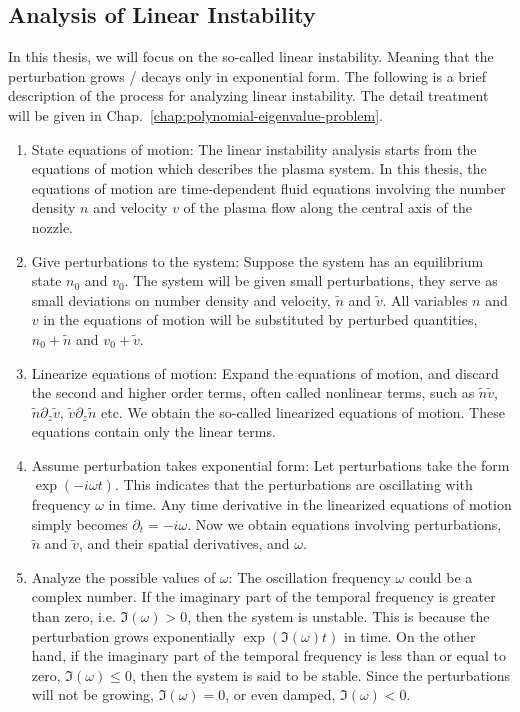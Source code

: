 \subsection{Analysis of Linear Instability}
In this thesis, we will focus on the so-called linear instability. Meaning that the perturbation grows / decays only in exponential form. The following is a brief description of the process for analyzing linear instability. The detail treatment will be given in Chap.~\ref{chap:polynomial-eigenvalue-problem}.

\begin{enumerate}
	\item State equations of motion: The linear instability analysis starts from the equations of motion which describes the plasma system. In this thesis, the equations of motion are time-dependent fluid equations involving the number density $n$ and velocity $v$ of the plasma flow along the central axis of the nozzle.
	\item Give perturbations to the system: Suppose the system has an equilibrium state $n_0$ and $v_0$. The system will be given small perturbations, they serve as small deviations on number density and velocity, $\tilde{n}$ and $\tilde{v}$. All variables $n$ and $v$ in the equations of motion will be substituted by perturbed quantities, $n_0+\tilde{n}$ and $v_0+\tilde{v}$.
	\item Linearize equations of motion: Expand the equations of motion, and discard the second and higher order terms, often called nonlinear terms, such as $\tilde{n}\tilde{v}$, $\tilde{n}\partial_z\tilde{v}$, $\tilde{v}\partial_z\tilde{n}$ etc. We obtain the so-called linearized equations of motion. These equations contain only the linear terms.
	\item Assume perturbation takes exponential form: Let perturbations take the form $\exp(-i\omega t)$. This indicates that the perturbations are oscillating with frequency $\omega$ in time. Any time derivative in the linearized equations of motion simply becomes $\partial_t = -i\omega$. Now we obtain equations involving perturbations, $\tilde{n}$ and $\tilde{v}$, and their spatial derivatives, and $\omega$.
	\item Analyze the possible values of $\omega$: The oscillation frequency $\omega$ could be a complex number. If the imaginary part of the temporal frequency is greater than zero, i.e. $\Im(\omega) > 0$, then the system is unstable. This is because the perturbation grows exponentially $\exp(\Im(\omega)t)$ in time. On the other hand, if the imaginary part of the temporal frequency is less than or equal to zero, $\Im(\omega) \leq 0$, then the system is said to be stable. Since the perturbations will not be growing, $\Im(\omega)=0$, or even damped, $\Im(\omega) < 0$.
\end{enumerate}

